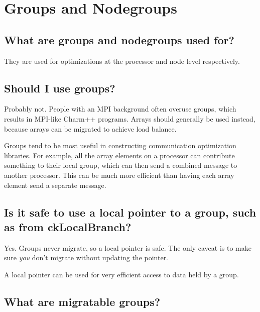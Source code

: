 \section{\charmpp{} Groups and Nodegroups}

\subsection{What are groups and nodegroups used for?}

They are used for optimizations at the processor and node level respectively.

\subsection{Should I use groups?}

Probably not. People with an MPI background often overuse groups, which
results in MPI-like Charm++ programs. Arrays should generally be used
instead, because arrays can be migrated to achieve load balance.

Groups tend to be most useful in constructing communication optimization
libraries. For example, all the array elements on a processor can
contribute something to their local group, which can then send a combined
message to another processor. This can be much more efficient than
having each array element send a separate message.

\subsection{Is it safe to use a local pointer to a group, such as from ckLocalBranch?}

Yes. Groups never migrate, so a local pointer is safe. The only caveat
is to make sure {\em you} don't migrate without updating the pointer.

A local pointer can be used for very efficient access to data held by
a group.




\subsection{What are migratable groups?}

